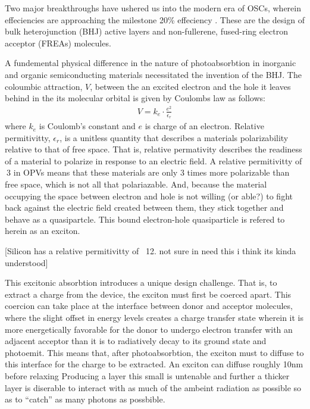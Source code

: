 Two major breakthroughs have ushered us into the modern era of OSCs,
wherein effeciencies are approaching the milestone 20\% effeciency \cite{Liu2020b}.
These are the design of bulk heterojunction (BHJ) active layers and non-fullerene, fused-ring electron
acceptor (FREAs) molecules. 

A fundemental physical difference in the nature of photoabsorbtion in inorganic and organic 
semiconducting materials necessitated the
invention of the BHJ. The coloumbic attraction, $V$, between the an excited
electron and the hole it leaves behind in the its molecular orbital
is given by Coulombs law as follows:
\begin{align}
    \label{coulomb}
    V  =  k_{e} \cdot \frac{e^{2}}{\epsilon_{r}}
\end{align}
where $k_{e}$ is Coulomb's constant and $e$ is charge of an electron. Relative permitivitty,
$\epsilon_{r}$, is a unitless quantity that describes a materials polarizability relative
to that of free space. That is, relative
permativity describes the readiness of a material
to polarize in response to an electric field. A
relative permitivitty of $~3$ in OPVs means that these materials are only $3$ times more polarizable than free space, which
is not all that polariazable. And, because the material occupying the space between electron and hole
is not willing (or able?) to fight back against the electric field created between them, they stick together and behave as a quasipartcle. 
This bound electron-hole quasiparticle is refered to herein as an exciton.

[Silicon has a relative permitivitty of ~12. not sure in need this i think its kinda understood]

This excitonic absorbtion introduces a unique design challenge.
That is, to extract a charge from the device, the exciton
must first be coerced apart. This coercion can take place at the interface between donor and acceptor molecules,
where the slight offset in energy levels creates a charge transfer state wherein it is more
energetically favorable for the donor to undergo electron transfer with an adjacent acceptor than
it is to radiatively decay to its ground state and photoemit.
This means that, after photoabsorbtion, the exciton must to diffuse to this interface for the charge to be
extracted. An exciton can diffuse roughly 10nm before relaxing \cite{clarke2010} 
Producing a layer this small is untenable and further a thicker layer
is diserable to interact with as much of the ambeint radiation as possible so as to ``catch'' as many photons
as possbible. 

